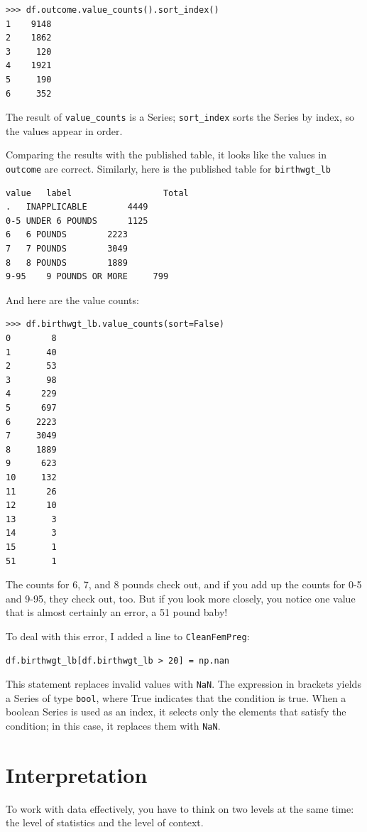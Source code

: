 \documentclass[12pt]{book}
\begin{document}
\begin{verbatim}
>>> df.outcome.value_counts().sort_index()
1    9148
2    1862
3     120
4    1921
5     190
6     352
\end{verbatim}

The result of \verb"value_counts" is a Series;
\verb"sort_index" sorts the Series by index, so the
values appear in order.

Comparing the results with the published table, it looks like the
values in {\tt outcome} are correct.  Similarly, here is the published
table for \verb"birthwgt_lb"

\begin{verbatim}
value	label                  Total
.	INAPPLICABLE	 	4449
0-5	UNDER 6 POUNDS	 	1125
6	6 POUNDS	 	2223
7	7 POUNDS	 	3049
8	8 POUNDS	 	1889
9-95	9 POUNDS OR MORE	 799
\end{verbatim}

And here are the value counts:

\begin{verbatim}
>>> df.birthwgt_lb.value_counts(sort=False)
0        8
1       40
2       53
3       98
4      229
5      697
6     2223
7     3049
8     1889
9      623
10     132
11      26
12      10
13       3
14       3
15       1
51       1
\end{verbatim}

The counts for 6, 7, and 8 pounds check out, and if you add
up the counts for 0-5 and 9-95, they check out, too.  But
if you look more closely, you notice one value that is almost
certainly an error, a 51 pound baby!

To deal with this error, I added a line to {\tt CleanFemPreg}:

\begin{verbatim}
df.birthwgt_lb[df.birthwgt_lb > 20] = np.nan
\end{verbatim}

This statement replaces invalid values with {\tt NaN}.
The expression in brackets yields a Series of type {\tt bool}, 
where True indicates that the condition is true.  When a boolean
Series is used as an index, it selects only the elements that
satisfy the condition; in this case, it replaces them with {\tt NaN}.


\section{Interpretation}

To work with data effectively, you have to think on two levels at the
same time: the level of statistics and the level of context.
\end{document}
